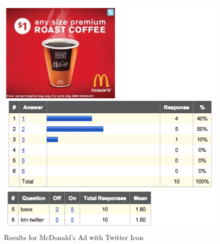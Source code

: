 \begin{figure}
\centerline{
\includegraphics[scale=.5]{chapter6.tex/twitter-example}
}
\caption{Results for McDonald's Ad with Twitter Icon}
\label{prepilot-twitter}
\end{figure}




